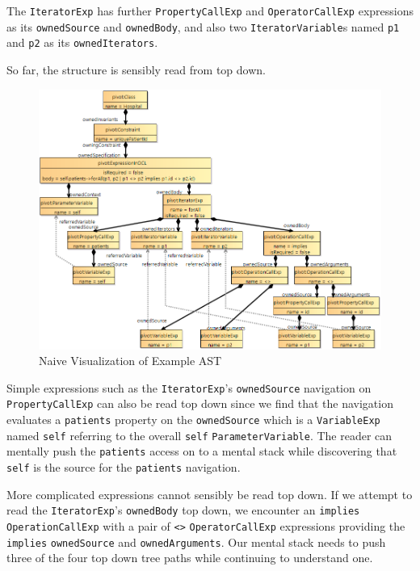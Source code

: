 \documentclass{llncs}
\begin{document}
The \verb$IteratorExp$ has further \verb$PropertyCallExp$ and \verb$OperatorCallExp$ expressions as its \verb$ownedSource$ and \verb$ownedBody$, and also two \verb$IteratorVariable$s named \verb$p1$ and \verb$p2$ as its \verb$ownedIterators$.

So far, the structure is sensibly read from top down.

\begin{figure}
	\vspace{-10pt}
	\begin{center}
		\includegraphics[width=4.8in]{UniqueIDAST.png}
	\end{center}
	\vspace{-10pt}
	\caption{Naive Visualization of Example AST}
	\label{fig:NaiveUniqueIDAST}
	\vspace{-10pt}
\end{figure}

Simple expressions such as the \verb$IteratorExp$'s \verb$ownedSource$ navigation on \verb$PropertyCallExp$ can also be read top down since we find that the navigation evaluates a \verb$patients$ property on the \verb$ownedSource$ which is a \verb$VariableExp$ named \verb$self$ referring to the overall \verb$self$ \verb$ParameterVariable$. The reader can mentally push the \verb$patients$ access on to a mental stack while discovering that \verb$self$ is the source for the \verb$patients$ navigation.

More complicated expressions cannot sensibly be read top down. If we attempt to read the \verb$IteratorExp$'s \verb$ownedBody$ top down, we encounter an \verb$implies$ \verb$OperationCallExp$ with a pair of \verb$<>$ \verb$OperatorCallExp$ expressions providing the \verb$implies$ \verb$ownedSource$ and \verb$ownedArguments$. Our mental stack needs to push three of the four top down tree paths while continuing to understand one.
\end{document}
